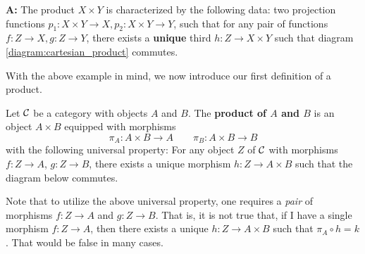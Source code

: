 \begin{example}
        \begin{center}
            \begin{minipage}{0.8\textwidth}
                \textbf{A:} The product $X \times Y$ is 
                characterized by the following data: two projection functions 
                $p_1: X\times Y \to X, p_2: X \times Y \to Y$, such that for any 
                pair of functions $f: Z \to X, g: Z \to Y$, there exists a \textbf{unique}
                third $h: Z \to X \times Y$ such that diagram \ref{diagram:cartesian_product} commutes.
            \end{minipage}
        \end{center}
    \end{example}

    With the above example in mind, we now introduce our first definition of a product.

    \begin{definition}
        Let $\mathcal{C}$ be a category with objects $A$ and $B$. 
        The \textbf{product of $A$ and $B$} is an object $A \times B$ 
        equipped with morphisms
        \[
            \pi_A: A \times B \to A \qquad 
            \pi_B: A \times B \to B            
        \]
        with the following universal property: For any object $Z$ of $\mathcal{C}$ with morphisms
        $f: Z \to A$, $g: Z \to B$, there exists a unique morphism $h: Z \to A \times B$ 
        such that the diagram below commutes. 
        \begin{center}
        \end{center}
    \end{definition}

    \begin{remark}
        Note that to utilize the above universal property, one requires a \emph{pair} of morphisms 
        $f: Z \to A$ and $g: Z \to B$. That is, it is not true that, if I have a single 
        morphism $f: Z \to A$, then there exists a unique $h: Z \to A \times B$ such that $\pi_A \circ h = k$. 
        That would be false in many cases. 
    \end{remark}
    
